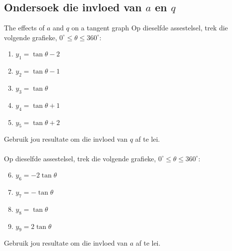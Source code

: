       

\subsection*{Ondersoek die invloed van $a$ en $q$}
\nopagebreak
\begin{Investigation}{The effects of $a$ and $q$ on a tangent graph}
Op dieselfde assestelsel, trek die volgende grafieke, $0^{\circ}\leq\theta\leq360^{\circ}$:
\begin{enumerate}[noitemsep, label=\textbf{\arabic*}. ] 
\item $y_1=\tan\theta -2$
\item $y_2=\tan\theta -1$
\item $y_3=\tan\theta $
\item $y_4=\tan\theta +1$
\item $y_5=\tan\theta +2$
\end{enumerate}
Gebruik jou resultate om die invloed van $q$ af te lei.\\
\\
Op dieselfde assestelsel, trek die volgende grafieke, $0^{\circ}\leq\theta\leq360^{\circ}$:
\begin{enumerate}[noitemsep, label=\textbf{\arabic*}. ] \setcounter{enumi}{5}
\item $y_6=-2\tan\theta $
\item $y_7=-\tan\theta $
\item $y_8=\tan\theta $
\item $y_9=2\tan\theta $
\end{enumerate}
Gebruik jou resultate om die invloed van $a$ af te lei.
\end{Investigation}


